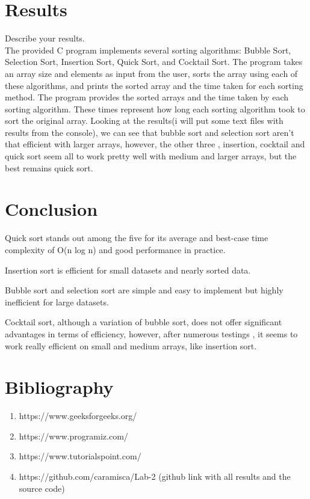 \documentclass[12pt]{article}
\begin{document}
\section*{Results}
\hspace{0.8cm}
Describe your results.\\
The provided C program implements several sorting algorithms: Bubble Sort, Selection Sort, Insertion Sort, Quick Sort, and Cocktail Sort. The program takes an array size and elements as input from the user, sorts the array using each of these algorithms, and prints the sorted array and the time taken for each sorting method.
The program provides the sorted arrays and the time taken by each sorting algorithm. These times represent how long each sorting algorithm took to sort the original array.
Looking at the results(i will put some text files with results from the console), we can see that bubble sort and selection sort aren't that efficient with larger arrays, however, the other three , insertion, cocktail and quick sort seem all to work pretty well with medium and larger arrays, but the best remains quick sort. 



\section*{Conclusion}
\hspace{0.8cm}
Quick sort stands out among the five for its average and best-case time complexity of O(n log n) and good performance in practice.

Insertion sort is efficient for small datasets and nearly sorted data.

Bubble sort and selection sort are simple and easy to implement but highly inefficient for large datasets.

Cocktail sort, although a variation of bubble sort, does not offer significant advantages in terms of efficiency, however, after numerous testings , it seems to work really efficient on small and medium arrays, like insertion sort. 


\section*{Bibliography}
\hspace{0.8cm}
\begin{enumerate}
  \item https://www.geeksforgeeks.org/
  \item https://www.programiz.com/
  \item https://www.tutorialspoint.com/
  \item https://github.com/caramisca/Lab-2 (github link with all results and the source code)
\end{enumerate}

\pagebreak
\end{document}
